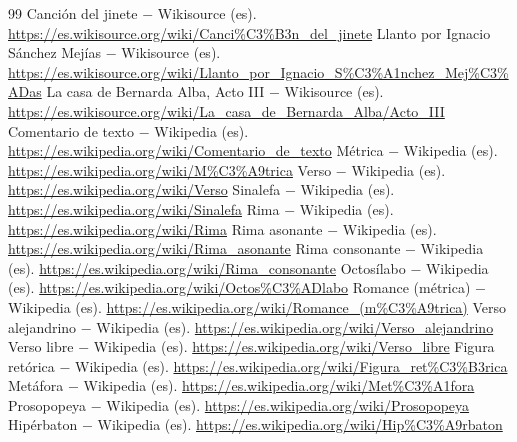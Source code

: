 \documentclass{book}
\begin{document}
\begin{thebibliography}{99}
 Canción del jinete \(-\) Wikisource (es). \url{https://es.wikisource.org/wiki/Canci%C3%B3n_del_jinete}
 Llanto por Ignacio Sánchez Mejías \(-\) Wikisource (es). \url{https://es.wikisource.org/wiki/Llanto_por_Ignacio_S%C3%A1nchez_Mej%C3%ADas}
 La casa de Bernarda Alba, Acto III \(-\) Wikisource (es). \url{https://es.wikisource.org/wiki/La_casa_de_Bernarda_Alba/Acto_III}
 Comentario de texto \(-\) Wikipedia (es). \url{https://es.wikipedia.org/wiki/Comentario_de_texto}
 Métrica \(-\) Wikipedia (es). \url{https://es.wikipedia.org/wiki/M%C3%A9trica}
 Verso \(-\) Wikipedia (es). \url{https://es.wikipedia.org/wiki/Verso}
 Sinalefa \(-\) Wikipedia (es). \url{https://es.wikipedia.org/wiki/Sinalefa}
 Rima \(-\) Wikipedia (es). \url{https://es.wikipedia.org/wiki/Rima}
 Rima asonante \(-\) Wikipedia (es). \url{https://es.wikipedia.org/wiki/Rima_asonante}
 Rima consonante \(-\) Wikipedia (es). \url{https://es.wikipedia.org/wiki/Rima_consonante}
 Octosílabo \(-\) Wikipedia (es). \url{https://es.wikipedia.org/wiki/Octos%C3%ADlabo}
 Romance (métrica) \(-\) Wikipedia (es). \url{https://es.wikipedia.org/wiki/Romance_(m%C3%A9trica)}
 Verso alejandrino \(-\) Wikipedia (es). \url{https://es.wikipedia.org/wiki/Verso_alejandrino}
 Verso libre \(-\) Wikipedia (es). \url{https://es.wikipedia.org/wiki/Verso_libre}
 Figura retórica \(-\) Wikipedia (es). \url{https://es.wikipedia.org/wiki/Figura_ret%C3%B3rica}
 Metáfora \(-\) Wikipedia (es). \url{https://es.wikipedia.org/wiki/Met%C3%A1fora}
 Prosopopeya \(-\) Wikipedia (es). \url{https://es.wikipedia.org/wiki/Prosopopeya}
 Hipérbaton \(-\) Wikipedia (es). \url{https://es.wikipedia.org/wiki/Hip%C3%A9rbaton}
\end{thebibliography}
\end{document}
